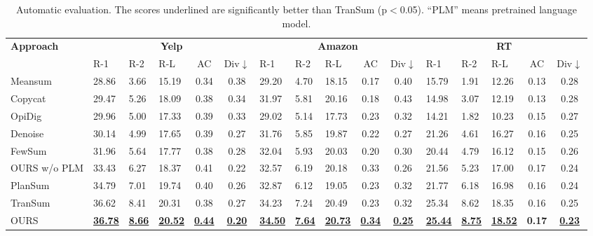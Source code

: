 \begin{table}[t]
	\centering
	\scriptsize
	\begin{tabular}{|l|m{0.45cm}<{\centering}m{0.45cm}<{\centering}m{0.45cm}<{\centering}cc|m{0.45cm}<{\centering}m{0.45cm}<{\centering}m{0.45cm}<{\centering}cc|m{0.45cm}<{\centering}m{0.45cm}<{\centering}m{0.45cm}<{\centering}cc|}
		\hline
		\multirow{2}{*}{\bf Approach} & \multicolumn{5}{c|}{\bf Yelp} &  \multicolumn{5}{c|}{\bf Amazon} & \multicolumn{5}{c|}{\bf RT} \\ \cline{2-16}
		& R-1 & R-2 & R-L& AC &Div$\downarrow$ & R-1 & R-2 & R-L& AC & Div$\downarrow$ & R-1 & R-2 & R-L& AC & Div$\downarrow$\\
		\hline
		Meansum & 28.86 & 3.66 & 15.19 & 0.34 & 0.38 &  29.20 &4.70 & 18.15& 0.17& 0.40 & 15.79 & 1.91 & 12.26 & 0.13 & 0.28 \\
		Copycat & 29.47 & 5.26 &18.09& 0.38 & 0.34 & 31.97 & 5.81 &20.16  & 0.18 & 0.43 & 14.98 & 3.07 & 12.19 & 0.13 & 0.28 \\
		OpiDig & 29.96 &5.00 & 17.33& 0.39 & 0.33 & 29.02 & 5.14 & 17.73 & 0.23 & 0.32 & 14.21 & 1.82& 10.23 & 0.15& 0.27 \\
		Denoise & 30.14 & 4.99 & 17.65& 0.39 & 0.27 &31.76 & 5.85 & 19.87 & 0.22 & 0.27 & 21.26 & 4.61& 16.27& 0.16& 0.25 \\
		FewSum
		& 31.96 & 5.64 & 17.77 & 0.38 & 0.28 & 32.04 & 5.93 & 20.03 & 0.20 & 0.30& 20.44& 4.79& 16.12 & 0.15& 0.26\\
		OURS w/o PLM & 33.43 & 6.27 & 18.37& 0.41 & 0.22 & 32.57 & 6.19 & 20.18 & 0.33 & 0.26& 21.56&5.23 & 17.00& 0.17& 0.24\\
		\hline
		PlanSum & 34.79&7.01 &19.74 &0.40 & 0.26 & 32.87 &6.12 & 19.05 & 0.23 & 0.32 & 21.77& 6.18 & 16.98 & 0.16 & 0.24 \\
		TranSum & 36.62&8.41 &20.31 &0.38 & 0.27 & 34.23& 7.24 & 20.49 & 0.23 & 0.32 & 25.34& 8.62& 18.35& 0.16 & 0.25\\
		OURS & \underline{\bf 36.78} & \underline{\bf 8.66} & \underline{\bf 20.52} &  \underline{\bf 0.44} &  \underline{\bf 0.20} & \underline{\bf 34.50} & \underline{\bf 7.64} & \underline{\bf 20.73} &  \underline{\bf 0.34} &  \underline{\bf 0.25} & \underline{\bf 25.44}& \underline{\bf 8.75}& \underline{\bf 18.52}& \bf 0.17&  \underline{\bf 0.23}\\
		\hline
	\end{tabular}
	\caption{Automatic evaluation. 
		The scores underlined are significantly better than TranSum (p$<$0.05). 
		``PLM'' means  pretrained language model. %
	}\label{tab:all}  
\end{table}

